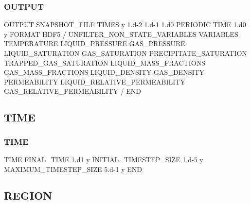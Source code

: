 \documentclass{beamer}
\begin{document}
\begin{frame}\frametitle{OUTPUT}

\begin{semiverbatim}

OUTPUT
  SNAPSHOT_FILE
    TIMES y 1.d-2 1.d-1 1.d0
    PERIODIC TIME 1.d0 y
    FORMAT HDF5
  /
  UNFILTER_NON_STATE_VARIABLES
\newpage  VARIABLES
   TEMPERATURE
   LIQUID_PRESSURE
   GAS_PRESSURE
   LIQUID_SATURATION
   GAS_SATURATION
   PRECIPITATE_SATURATION
   TRAPPED_GAS_SATURATION
   LIQUID_MASS_FRACTIONS
   GAS_MASS_FRACTIONS
   LIQUID_DENSITY
   GAS_DENSITY
   PERMEABILITY
   LIQUID_RELATIVE_PERMEABILITY
   GAS_RELATIVE_PERMEABILITY
  /
END
\end{semiverbatim}

\end{frame}

\subsection{TIME}

\begin{frame}[fragile]\frametitle{TIME}
\begin{semiverbatim}

TIME
  FINAL_TIME 1.d1 y
  INITIAL_TIMESTEP_SIZE 1.d-5 y
  MAXIMUM_TIMESTEP_SIZE 5.d-1 y
END

\end{semiverbatim}

\end{frame}

\subsection{REGION}
\end{document}
